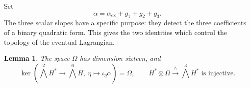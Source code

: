 \documentclass[11pt]{article}
\newtheorem{lemma}[theorem]{Lemma}
\theoremstyle{definition}
\theoremstyle{remark}
\numberwithin{equation}{section}
\begin{document}
Set
\begin{equation}
 \alpha=\alpha_{\mathrm{ex}}+g_1+g_2+g_3.
 \label{hodge:alpha}
\end{equation}
The three scalar slopes have a specific purpose: they detect the three
coefficients of a binary quadratic form.  This gives the two identities
which control the topology of the eventual Lagrangian.

\begin{lemma}
\label{hodge:linear-algebra}
The space $\Omega$ has dimension sixteen, and
\begin{equation}
 \ker\left(\bigwedge^2H^*\longrightarrow\bigwedge^6H,
                \ \eta\longmapsto\iota_\eta\alpha\right)=\Omega,
 \qquad
 H^*\otimes\Omega\xrightarrow{\ \wedge\ }\bigwedge^3H^*
 \text{ is injective}.
 \label{hodge:linear-identities}
\end{equation}
\end{lemma}
\end{document}
